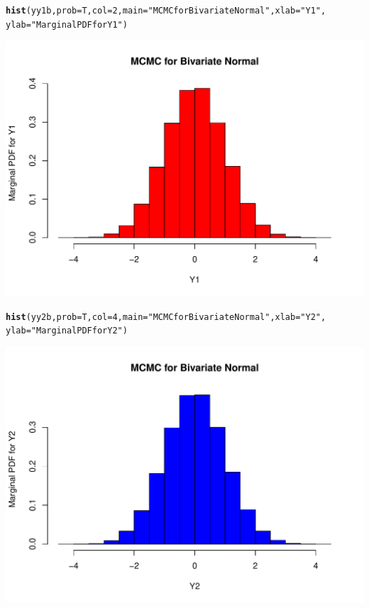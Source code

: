 \documentclass[12pt, a4paper, oneside]{article}\usepackage{graphicx, color}
\makeatletter
\def\maxwidth{ %
  \ifdim\Gin@nat@width>\linewidth
    \linewidth
  \else
    \Gin@nat@width
  \fi
}
\newcommand{\hlfunctioncall}[1]{\textcolor[rgb]{0.501960784313725,0,0.329411764705882}{\textbf{#1}}}%
\newcommand{\hlstring}[1]{\textcolor[rgb]{0.6,0.6,1}{#1}}%
\newenvironment{kframe}{%
 \def\at@end@of@kframe{}%
 \ifinner\ifhmode%
  \def\at@end@of@kframe{\end{minipage}}%
  \begin{minipage}{\columnwidth}%
 \fi\fi%
 \def\FrameCommand##1{\hskip\@totalleftmargin \hskip-\fboxsep
 \colorbox{shadecolor}{##1}\hskip-\fboxsep
     \hskip-\linewidth \hskip-\@totalleftmargin \hskip\columnwidth}%
 \MakeFramed {\advance\hsize-\width
   \@totalleftmargin\z@ \linewidth\hsize
   \@setminipage}}%
 {\par\unskip\endMakeFramed%
 \at@end@of@kframe}
\newenvironment{knitrout}{}{} %
\makeatother
\begin{document}
\begin{knitrout}
\color{fgcolor}\begin{kframe}
\begin{alltt}
\hlfunctioncall{hist}(yy1b, prob = T, col = 2, main = \hlstring{"MCMC for Bivariate Normal"}, xlab = \hlstring{"Y1"}, 
    ylab = \hlstring{"Marginal PDF for Y1"})
\end{alltt}
\end{kframe}
\includegraphics[width=\maxwidth]{figure/Hist1} 
\begin{kframe}\begin{alltt}
\hlfunctioncall{hist}(yy2b, prob = T, col = 4, main = \hlstring{"MCMC for Bivariate Normal"}, xlab = \hlstring{"Y2"}, 
    ylab = \hlstring{"Marginal PDF for Y2"})
\end{alltt}
\end{kframe}
\includegraphics[width=\maxwidth]{figure/Hist2} 

\end{knitrout}
\end{document}
